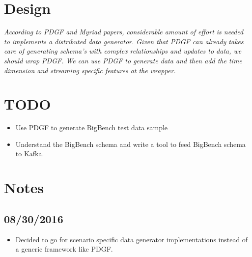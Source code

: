 \documentclass{thesis}
\begin{document}
\section{Design}

\emph{According to PDGF and Myriad papers, considerable amount of effort is needed to implements a distributed data generator. Given that PDGF can already takes care of generating schema's with complex relationships and updates to data, we should wrap PDGF. We can use PDGF to generate data and then add the time dimension and streaming specific features at the wrapper.}

\section{TODO}

\begin{itemize}
	\item Use PDGF to generate BigBench test data sample
	\item Understand the BigBench schema and write a tool to feed BigBench schema to Kafka.
\end{itemize}

\section{Notes}

\subsection{08/30/2016}

\begin{itemize}
    \item Decided to go for scenario specific data generator implementations instead of a generic framework like PDGF.
\end{itemize}




\end{document}
